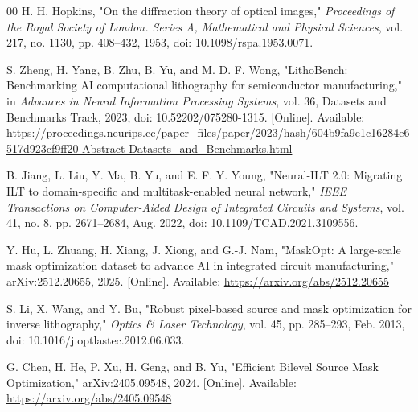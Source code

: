 \documentclass[conference]{IEEEtran}
\begin{document}
\begin{thebibliography}{00}
H. H. Hopkins, "On the diffraction theory of optical images," \textit{Proceedings of the Royal Society of London. Series A, Mathematical and Physical Sciences}, vol. 217, no. 1130, pp. 408--432, 1953, doi: 10.1098/rspa.1953.0071.

S. Zheng, H. Yang, B. Zhu, B. Yu, and M. D. F. Wong, "LithoBench: Benchmarking AI computational lithography for semiconductor manufacturing," in \textit{Advances in Neural Information Processing Systems}, vol. 36, Datasets and Benchmarks Track, 2023, doi: 10.52202/075280-1315. [Online]. Available: \url{https://proceedings.neurips.cc/paper_files/paper/2023/hash/604b9fa9e1c16284e6517d923cf9ff20-Abstract-Datasets_and_Benchmarks.html}

B. Jiang, L. Liu, Y. Ma, B. Yu, and E. F. Y. Young, "Neural-ILT 2.0: Migrating ILT to domain-specific and multitask-enabled neural network," \textit{IEEE Transactions on Computer-Aided Design of Integrated Circuits and Systems}, vol. 41, no. 8, pp. 2671--2684, Aug. 2022, doi: 10.1109/TCAD.2021.3109556.

Y. Hu, L. Zhuang, H. Xiang, J. Xiong, and G.-J. Nam, "MaskOpt: A large-scale mask optimization dataset to advance AI in integrated circuit manufacturing," arXiv:2512.20655, 2025. [Online]. Available: \url{https://arxiv.org/abs/2512.20655}

S. Li, X. Wang, and Y. Bu, "Robust pixel-based source and mask optimization for inverse lithography," \textit{Optics \& Laser Technology}, vol. 45, pp. 285--293, Feb. 2013, doi: 10.1016/j.optlastec.2012.06.033.

G. Chen, H. He, P. Xu, H. Geng, and B. Yu, "Efficient Bilevel Source Mask Optimization," arXiv:2405.09548, 2024. [Online]. Available: \url{https://arxiv.org/abs/2405.09548}

\end{thebibliography}
\end{document}

